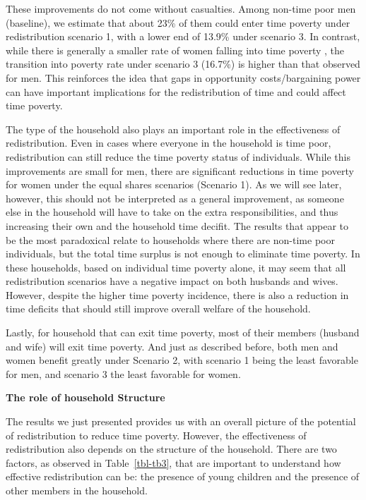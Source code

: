 \documentclass[
  11pt,
]{article}
\begin{document}
These improvements do not come without casualties. Among non-time poor
men (baseline), we estimate that about 23\% of them could enter time
poverty under redistribution scenario 1, with a lower end of 13.9\%
under scenario 3. In contrast, while there is generally a smaller rate
of women falling into time poverty , the transition into poverty rate
under scenario 3 (16.7\%) is higher than that observed for men. This
reinforces the idea that gaps in opportunity costs/bargaining power can
have important implications for the redistribution of time and could
affect time poverty.

The type of the household also plays an important role in the
effectiveness of redistribution. Even in cases where everyone in the
household is time poor, redistribution can still reduce the time poverty
status of individuals. While this improvements are small for men, there
are significant reductions in time poverty for women under the equal
shares scenarios (Scenario 1). As we will see later, however, this
should not be interpreted as a general improvement, as someone else in
the household will have to take on the extra responsibilities, and thus
increasing their own and the household time decifit. The results that
appear to be the most paradoxical relate to households where there are
non-time poor individuals, but the total time surplus is not enough to
eliminate time poverty. In these households, based on individual time
poverty alone, it may seem that all redistribution scenarios have a
negative impact on both husbands and wives. However, despite the higher
time poverty incidence, there is also a reduction in time deficits that
should still improve overall welfare of the household.

Lastly, for household that can exit time poverty, most of their members
(husband and wife) will exit time poverty. And just as described before,
both men and women benefit greatly under Scenario 2, with scenario 1
being the least favorable for men, and scenario 3 the least favorable
for women.

\textbf{The role of household Structure}

The results we just presented provides us with an overall picture of the
potential of redistribution to reduce time poverty. However, the
effectiveness of redistribution also depends on the structure of the
household. There are two factors, as observed in Table~\ref{tbl-tb3},
that are important to understand how effective redistribution can be:
the presence of young children and the presence of other members in the
household.
\end{document}
